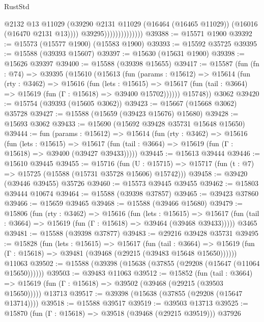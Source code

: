 \begin{lexlean}{RustStd}
\begin{coremodule}
                                  @2132
                                  @13
                                  @11029
                                  (@39290
                                    @2131
                                    @11029
                                    (@16464 (@16465 @11029))
                                    (@16016 (@16470 @2131 @13))))
                                @39295))))))))))))))
@39388 := @15571 @1900
@39392 := @15573 (@15577 @1900) (@15583 @1900)
@39393 := @15592 @35725
@39395 := @15588 (@39393 @15607)
@39397 := @15630 (@15631 @1900)
@39398 := @15626 @39397
@39400 := @15588 (@39398 @15655)
@39417 := @15587
    (fun (fn : @74) =>
    @39395
      (@15610
        (@15613
          (fun (params : @15612) =>
          @15614
            (fun (rty : @3462) =>
            @15616
              (fun (lets : @15615) =>
              @15617 (fun (tail : @3664) => @15619 (fun (Γ : @15618) => @39400 @15702))))))
        @15748))
    @3062
@39420 := @15754 (@39393 (@15605 @3062))
@39423 := @15667 (@15668 @3062) @35728
@39427 := @15588 (@15659 (@39423 @15676) @15680)
@39428 := @15693 @3062
@39433 := @15690 (@15692 @39428 @35731 @15648 @15650)
@39444 := fun (params : @15612) =>
  @15614
    (fun (rty : @3462) =>
    @15616
      (fun (lets : @15615) =>
      @15617 (fun (tail : @3664) => @15619 (fun (Γ : @15618) => @39400 (@39427 @39433)))))
@39445 := @15613 @39444
@39446 := @15610 @39445
@39455 := @15716
    (fun (U : @15715) => @15717 (fun (t : @7) => @15725 (@15588 (@15731 @35728 @15606) @15742)))
@39458 := @39420 (@39446 @39455) @35726
@39460 := @15573 @39445 @39455
@39462 := @15803 @39444 @10674
@39464 := @15588 (@39398 @37857)
@39465 := @39423 @37860
@39466 := @15659 @39465
@39468 := @15588 (@39466 @15680)
@39479 := @15806
    (fun (rty : @3462) =>
    @15616
      (fun (lets : @15615) =>
      @15617 (fun (tail : @3664) => @15619 (fun (Γ : @15618) => @39464 (@39468 @39433)))))
    @3465
@39481 := @15588 (@39398 @37877)
@39483 := @29216 @39428 @35731
@39495 := @15828
    (fun (lets : @15615) =>
    @15617
      (fun (tail : @3664) =>
      @15619 (fun (Γ : @15618) => @39481 (@39468 (@29215 (@39483 @15648 @15650))))))
    @11063
@39502 := @15588 (@39398 (@15638 (@37855 (@29208 (@15647 (@11064 @15650))))))
@39503 := @39483 @11063
@39512 := @15852
    (fun (tail : @3664) => @15619 (fun (Γ : @15618) => @39502 (@39468 (@29215 (@39503 @15650)))))
    @13713
@39517 := @39398 (@15638 (@37855 (@29208 (@15647 @13714))))
@39518 := @15588 @39517
@39519 := @39503 @13713
@39525 := @15870 (fun (Γ : @15618) => @39518 (@39468 (@29215 @39519))) @37926

\end{coremodule}
\end{lexlean}
